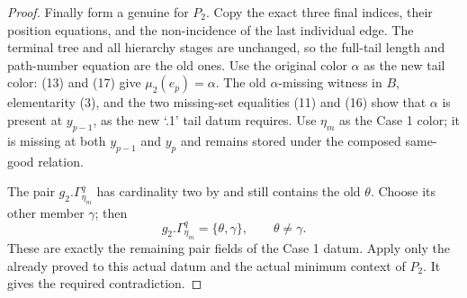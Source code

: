 \begin{proof}
Finally form a genuine
 for \(P_2\).  Copy the exact
three final indices, their position equations, and the non-incidence of
the last individual edge.  The terminal tree and all hierarchy stages
are unchanged, so the full-tail length and path-number equation are the
old ones.  Use the original color \(\alpha\) as the new tail color:
(13) and (17) give \(\mu_2(e_p)=\alpha\).  The old \(\alpha\)-missing
witness in \(B\), elementarity (3), and the two missing-set equalities
(11) and (16) show that \(\alpha\) is present at \(y_{p-1}\), as the
new `.1' tail datum requires.  Use \(\eta_m\) as the Case 1 color; it is
missing at both \(y_{p-1}\) and \(y_p\) and remains stored under the
composed same-good relation.

The pair \(g_2.\Gamma^q_{\eta_m}\) has cardinality two by
 and still contains the old \(\theta\).  Choose
its other member \(\gamma\); then
\[
       g_2.\Gamma^q_{\eta_m}=\{\theta,\gamma\},\qquad
       \theta\ne\gamma.                                    \tag{18}
\]
These are exactly the remaining pair fields of the Case 1 datum.  Apply
only the already proved  to
this actual datum and the actual minimum context of \(P_2\).  It gives
the required contradiction.
\end{proof}
